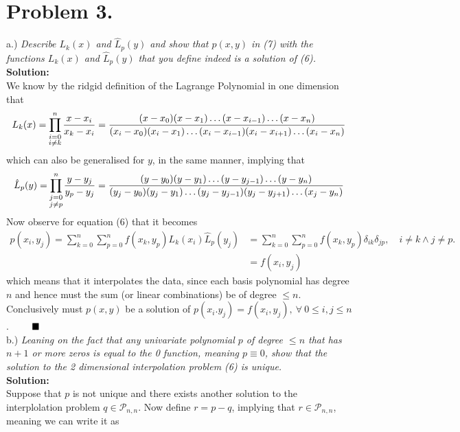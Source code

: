 \documentclass[12pt,
               a4paper,
               article,
               oneside,
               english,oldfontcommands]{memoir}
\newcommand{\Q}{ \qquad \hfill \blacksquare}
\newcommand{\spaze}{\vspace{4mm}\\}
\begin{document}
\section*{\centering Problem 3.}
a.) \emph{Describe $L_{k}(x)$ and $\hat{L}_{p}(y)$ and show that $p(x,y)$ in (7) with the functions $L_{k}(x)$ and $\hat{L}_{p}(y)$ that you define indeed is a solution of (6).} \spaze
 \textbf{Solution:} \spaze 
 We know by the ridgid definition of the Lagrange Polynomial in one dimension that 
 \begin{align*}
 L_{k}(x) =   \prod_{\mathclap{\substack{i = 0\\
                              i \neq k \\}}}^{n} \frac{x - x_{i}}{x_k - x_i} = \frac{(x - x_0) (x - x_1 )\ldots( x- x_{i-1}) \ldots (x - x_n)}{(x_i - x_0)(x_i - x_1) \ldots (x_i - x_{i-1}) (x_i - x_{i+1}) \ldots (x_i - x_n)}
 \end{align*}
 which can also be generalised for $y$, in the same manner, implying that 
 \begin{align*}
\hat{L}_{p}(y) =  \prod_{\mathclap{\substack{j= 0\\
                              j \neq p \\}}}^{n} \frac{y - y_j}{y_p - y_j} =\frac{(y - y_0) (y - y_1 )\ldots( y- y_{j-1}) \ldots (y - y_n)}{(y_j - y_0)(y_j - y_1) \ldots (y_j - y_{j-1}) (y_j - y_{j+1}) \ldots (x_j - y_n)}
 \end{align*}
 Now observe for equation (6) that it becomes 
 \begin{align*}
 p(x_i,y_j) = \sum_{k=0}^{n}  \sum_{p=0}^{n} f(x_k, y_p) L_{k}(x_i) \hat{L}_{p}(y_j) &= \sum_{k=0}^{n}  \sum_{p=0}^{n} f(x_k, y_p) \delta_{ik} \delta_{jp}, \quad i \neq k \land j\neq p. \\[5pt]
 &= f(x_i, y_j)
 \end{align*}
 which means that it interpolates the data, since each basis polynomial has degree $n$ and hence must the sum (or linear combinations) be of degree $\leq n$. Conclusively must $p(x,y)$ be a solution of $p(x_i. y_j) = f(x_i, y_j), \ \forall \ 0 \leq i,j \leq n$.  $\Q$ \spaze
b.) \emph{Leaning on the fact that any univariate polynomial $p$ of degree $ \leq n$ that has $n + 1$ or more zeros is equal to the 0 function, meaning $ p \equiv 0$, show that the solution to the 2 dimensional interpolation problem (6) is unique.}\spaze 
\textbf{Solution:} \spaze
Suppose that $p$ is not unique and there exists another solution to the interplolation problem $q \in \mathcal{P}_{n,n}$. Now define $r = p - q$, implying that $r \in \mathcal{P}_{n,n}$, meaning we can write it as 
\end{document}
